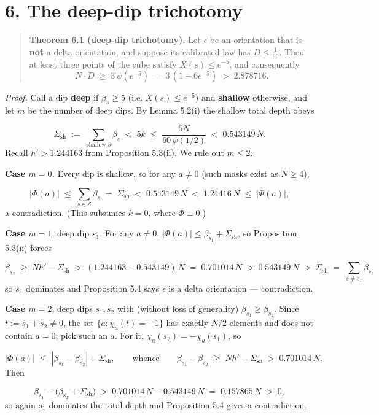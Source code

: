 \documentclass[11pt]{article}
\begin{document}
\section*{6. The deep-dip trichotomy}
\begin{quote}
\textbf{Theorem 6.1 (deep-dip trichotomy).}  Let $\epsilon$ be an orientation that is \textbf{not} a delta orientation, and suppose its calibrated law has $D \le \frac1{60}$.  Then at least three points of the cube satisfy $X(s) \le e^{-5}$, and consequently
\[
N \cdot D \;\ge\; 3\,\psi(e^{-5}) \;=\; 3\,(1 - 6e^{-5})
\;>\; 2.878716 .
\]
\end{quote}
\emph{Proof.}  Call a dip \textbf{deep} if $\beta_s \ge 5$ (i.e. $X(s) \le e^{-5}$) and \textbf{shallow} otherwise, and let $m$ be the number of deep dips.  By Lemma 5.2(i) the shallow total depth obeys

\[
\Sigma_{\mathrm{sh}} \;:=\; \sum_{\text{shallow } s} \beta_s
\;<\; 5k \;\le\; \frac{5N}{60\,\psi(1/2)} \;<\; 0.543149\,N .
\]
Recall $h' > 1.244163$ from Proposition 5.3(ii).  We rule out $m \le 2$.

\textbf{Case $m = 0$.}  Every dip is shallow, so for any $a \ne 0$ (such masks exist as $N \ge 4$),

\[
|\Phi(a)| \;\le\; \sum_{s \in \mathcal S}\beta_s \;=\;
\Sigma_{\mathrm{sh}} \;<\; 0.543149\,N \;<\; 1.24416\,N \;\le\;
|\Phi(a)|,
\]
a contradiction.  (This subsumes $k = 0$, where $\Phi \equiv 0$.)

\textbf{Case $m = 1$}, deep dip $s_1$.  For any $a \ne 0$, $|\Phi(a)| \le \beta_{s_1} + \Sigma_{\mathrm{sh}}$, so Proposition 5.3(ii) forces

\[
\beta_{s_1} \;\ge\; N h' - \Sigma_{\mathrm{sh}}
\;>\; (1.244163 - 0.543149)\,N \;=\; 0.701014\,N
\;>\; 0.543149\,N \;>\; \Sigma_{\mathrm{sh}}
\;=\; \sum_{s \ne s_1}\beta_s ,
\]
so $s_1$ dominates and Proposition 5.4 says $\epsilon$ is a delta orientation — contradiction.

\textbf{Case $m = 2$}, deep dips $s_1, s_2$ with (without loss of generality) $\beta_{s_1} \ge \beta_{s_2}$.  Since $t := s_1 + s_2 \ne 0$, the set $\{a : \chi_a(t) = -1\}$ has exactly $N/2$ elements and does not contain $a = 0$; pick such an $a$.  For it, $\chi_a(s_2) = -\chi_a(s_1)$, so

\[
|\Phi(a)| \;\le\; |\beta_{s_1} - \beta_{s_2}| + \Sigma_{\mathrm{sh}},
\qquad\text{whence}\qquad
\beta_{s_1} - \beta_{s_2} \;\ge\; Nh' - \Sigma_{\mathrm{sh}} \;>\;
0.701014\,N .
\]
Then

\[
\beta_{s_1} - \Big(\beta_{s_2} + \Sigma_{\mathrm{sh}}\Big)
\;>\; 0.701014\,N - 0.543149\,N \;=\; 0.157865\,N \;>\; 0,
\]
so again $s_1$ dominates the total depth and Proposition 5.4 gives a contradiction.
\end{document}
